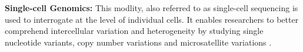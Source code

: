 \textbf{Single-cell Genomics: }This modlity, also referred to as single-cell  sequencing is used to interrogate  at the level of individual cells. It enables researchers to better comprehend intercellular variation and heterogeneity by studying single nucleotide variants, copy number variations and microsatellite variations \textbf{\cite{stein_single-cell_2021,luquette_identification_2019,mallory_methods_2020,woodworth_building_2017}}.\\

